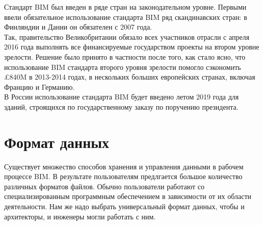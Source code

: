 \documentclass[a4paper,14pt]{extreport} %
\begin{document}
\newpage
Стандарт BIM был введен в ряде стран на законодательном уровне\cite{BIM_USAGE}.
Первыми ввели обязательное использование стандарта BIM ряд скандинавских стран: в Финляндии и Дании он обязателен с 2007 года. \\
Так, правительство Великобритании обязало всех участников отрасли с апреля 2016 года выполнять все финансируемые государством проекты на втором уровне зрелости\cite{BIM_UK}. Решение было принято в частности после того, как стало ясно, что использование BIM стандарта второго уровня зрелости помогло сэкономить £840M в 2013-2014 годах, в нескольких больших европейских странах, включая Францию и Германию. \\
В России использование стандарта BIM будет введено летом 2019 года для зданий, строящихся по государственному заказу по поручению президента\cite{BIM_RUSSIA}.

\newpage
\section{Формат данных}

Существует множество способов хранения и управления данными в рабочем процессе BIM. В результате пользователям предлгается большое количество различных форматов файлов.
Обычно пользователи работают со специализированным программным обеспечением в зависимости от их области деятельности. Нам же надо выбрать универсальный формат данных, чтобы и архитекторы, и инженеры могли работать с ним.
\end{document}
